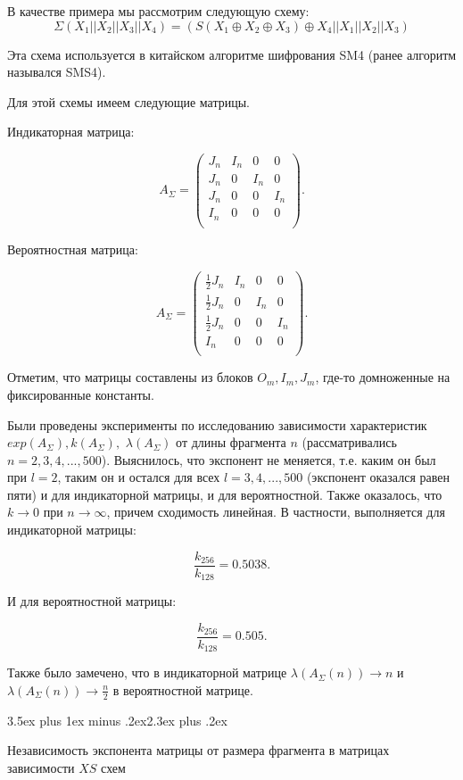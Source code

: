 \documentclass[a4paper,12pt]{report}
\makeatletter
\theoremstyle{plain} %
\theoremstyle{definition}
\theoremstyle{remark}
\renewcommand{\section}{\@startsection{section}{1}{18pt}%
{3.5ex plus 1ex minus .2ex}{2.3ex plus .2ex}%
{\normalfont\Large\bfseries\raggedright}}%
\makeatother
\begin{document}
\begin{large}
В качестве примера мы рассмотрим следующую схему: 
$$\Sigma(X_1||X_2||X_3||X_4)=(S(X_1\oplus X_2 \oplus X_3)\oplus X_4 || X_1 || X_2 || X_3)$$

Эта схема используется в китайском алгоритме шифрования SM4 (ранее алгоритм назывался SMS4).

Для этой схемы имеем следующие матрицы.

Индикаторная матрица:

$$
A_{\Sigma} = 
\begin{pmatrix} 
J_n & I_n & 0 & 0\\ 
J_n & 0 & I_n & 0\\
 J_n & 0 & 0 & I_n\\
I_n &  0  & 0 & 0\\
\end{pmatrix}.
$$

Вероятностная матрица:

$$
A_{\Sigma} = 
\begin{pmatrix} 
\frac{1}{2}
J_n & I_n & 0 & 0\\ 
\frac{1}{2}J_n & 0 & I_n & 0\\
\frac{1}{2} J_n & 0 & 0 & I_n\\
I_n &  0  & 0 & 0\\
\end{pmatrix}.
$$

Отметим, что матрицы составлены из блоков $O_m, I_m, J_m$, где-то домноженные на фиксированные константы.

Были проведены эксперименты по исследованию зависимости характеристик $exp(A_{\Sigma}), k(A_{\Sigma}),$ $\lambda(A_{\Sigma})$ от длины фрагмента $n$ (рассматривались $n=2,3,4,...,500$). Выяснилось, что экспонент не меняется, т.е. каким он был при $l=2$, таким он и остался для всех $l=3,4,...,500$ (экспонент оказался равен пяти) и для индикаторной матрицы, и для вероятностной. Также оказалось, что $k \rightarrow 0$ при $n \rightarrow \infty$, причем сходимость линейная. В частности, выполняется для индикаторной матрицы:

$$\frac{k_{256}}{k_{128}} = 0.5038.$$

И для вероятностной матрицы:

$$\frac{k_{256}}{k_{128}} = 0.505.$$

Также было замечено, что в индикаторной матрице $\lambda(A_{\Sigma}(n)) \rightarrow n$ и $\lambda(A_{\Sigma}(n)) \rightarrow \frac{n}{2}$ в вероятностной матрице.

\section{Независимость экспонента матрицы от размера фрагмента в матрицах зависимости $XS$ схем}


\end{large}
\end{document}
